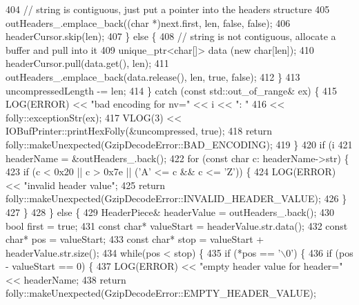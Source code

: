 \begin{DoxyCode}
404         \textcolor{comment}{// string is contiguous, just put a pointer into the headers structure}
405         outHeaders_.emplace\_back((\textcolor{keywordtype}{char} *)next.first, len, \textcolor{keyword}{false}, \textcolor{keyword}{false});
406         headerCursor.skip(len);
407       \} \textcolor{keywordflow}{else} \{
408         \textcolor{comment}{// string is not contiguous, allocate a buffer and pull into it}
409         unique\_ptr<char[]> data (\textcolor{keyword}{new} \textcolor{keywordtype}{char}[len]);
410         headerCursor.pull(data.get(), len);
411         outHeaders_.emplace\_back(data.release(), len, \textcolor{keyword}{true}, \textcolor{keyword}{false});
412       \}
413       uncompressedLength -= len;
414     \} \textcolor{keywordflow}{catch} (\textcolor{keyword}{const} std::out\_of\_range& ex) \{
415       LOG(ERROR) << \textcolor{stringliteral}{"bad encoding for nv="} << i << \textcolor{stringliteral}{": "}
416                  << folly::exceptionStr(ex);
417       VLOG(3) << IOBufPrinter::printHexFolly(&uncompressed, \textcolor{keyword}{true});
418       \textcolor{keywordflow}{return} folly::makeUnexpected(GzipDecodeError::BAD_ENCODING);
419     \}
420     \textcolor{keywordflow}{if} (i %
421       headerName = &outHeaders_.back();
422       \textcolor{keywordflow}{for} (\textcolor{keyword}{const} \textcolor{keywordtype}{char} c: headerName->str) \{
423         \textcolor{keywordflow}{if} (c < 0x20 || c > 0x7e || (\textcolor{charliteral}{'A'} <= c && c <= \textcolor{charliteral}{'Z'})) \{
424           LOG(ERROR) << \textcolor{stringliteral}{"invalid header value"};
425           \textcolor{keywordflow}{return} folly::makeUnexpected(GzipDecodeError::INVALID_HEADER_VALUE);
426         \}
427       \}
428     \} \textcolor{keywordflow}{else} \{
429       HeaderPiece& headerValue = outHeaders_.back();
430       \textcolor{keywordtype}{bool} first = \textcolor{keyword}{true};
431       \textcolor{keyword}{const} \textcolor{keywordtype}{char}* valueStart = headerValue.str.data();
432       \textcolor{keyword}{const} \textcolor{keywordtype}{char}* pos = valueStart;
433       \textcolor{keyword}{const} \textcolor{keywordtype}{char}* stop = valueStart + headerValue.str.size();
434       \textcolor{keywordflow}{while}(pos < stop) \{
435         \textcolor{keywordflow}{if} (*pos == \textcolor{charliteral}{'\(\backslash\)0'}) \{
436           \textcolor{keywordflow}{if} (pos - valueStart == 0) \{
437             LOG(ERROR) << \textcolor{stringliteral}{"empty header value for header="} << headerName;
438             \textcolor{keywordflow}{return} folly::makeUnexpected(GzipDecodeError::EMPTY_HEADER_VALUE);

\end{DoxyCode}
